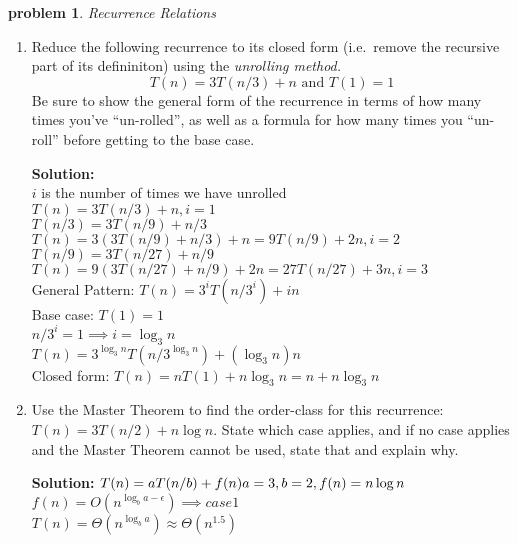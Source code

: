 \documentclass[10pt]{article}
\newtheorem{problem}{\sc\color{cit}problem}
\begin{document}
\begin{problem} Recurrence Relations \end{problem}
      \begin{enumerate}   
    
    	\item Reduce the following recurrence to its closed form (i.e.\ remove the recursive part of its defininiton) using the \emph{unrolling method.}
    	$$T(n) = 3 T(n/3) + n \textrm{ and } T(1) = 1$$
    	Be sure to show the general form of the recurrence in terms of how many times you've ``un-rolled'', as well as a formula for how many times you ``un-roll'' before getting to the base case.
    	
    	\textbf{Solution:}  \\
    	$i$ is the number of times we have unrolled \\
    	$T(n) = 3 T(n/3) + n, i = 1$\\
    	$T(n/3) = 3 T(n/9) + n/3$ \\
    	$T(n) = 3(3 T(n/9) + n/3)+n = 9T(n/9)+2n, i = 2$ \\
    	$T(n/9) = 3 T(n/27) + n/9$ \\
    	$T(n) = 9(3 T(n/27) + n/9)+2n = 27T(n/27)+3n, i = 3$ \\
    	General Pattern: $T(n) = 3^i T(n/3^i) + in$ \\
    	Base case: $T(1) = 1$ \\
    	$n/3^i = 1 \implies i = \log_3 n$ \\
    	$T(n) = 3^{\log_3 n} T\left(n/3^{\log_3 n}\right) + \left(\log_3 n\right)n$ \\
    	Closed form: $T(n) = nT(1) + n\log_3 n = n + n \log_3 n$
    
    	\item Use the Master Theorem to find the order-class for this recurrence: $T(n) = 3 T (n/2) + n \log n$.  State which case applies, and if no case applies and the Master Theorem cannot be used, state that and explain why.
    	
    	\textbf{Solution:}  $T(n) = aT(n/b)+f(n) \\
    	a = 3, b = 2, f(n) = n\log n$ \\
    	$f(n) = O\left(n^{\log_b a - \epsilon}\right) \implies case1$ \\
    	$T(n) = \Theta (n^{\log_b a}) \approx \Theta (n^{1.5})$
    	
    	


\end{enumerate}
\end{document}

